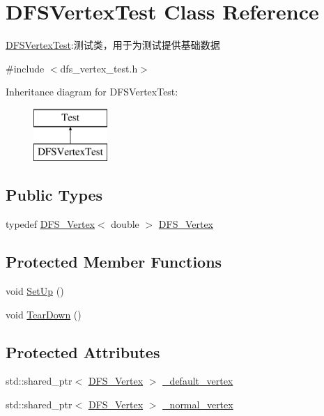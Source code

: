\hypertarget{class_d_f_s_vertex_test}{}\section{D\+F\+S\+Vertex\+Test Class Reference}
\label{class_d_f_s_vertex_test}


\hyperlink{class_d_f_s_vertex_test}{D\+F\+S\+Vertex\+Test}\+:测试类，用于为测试提供基础数据  




{\ttfamily \#include $<$dfs\+\_\+vertex\+\_\+test.\+h$>$}

Inheritance diagram for D\+F\+S\+Vertex\+Test\+:\begin{figure}[H]
\begin{center}
\leavevmode
\includegraphics[height=2.000000cm]{class_d_f_s_vertex_test}
\end{center}
\end{figure}
\subsection*{Public Types}
\begin{DoxyCompactItemize}
\item 
typedef \hyperlink{class_d_f_s_vertex_test_aee693bcc01455e6f663b1404ce66e914}{D\+F\+S\+\_\+\+Vertex}$<$ double $>$ \hyperlink{class_d_f_s_vertex_test_aee693bcc01455e6f663b1404ce66e914}{D\+F\+S\+\_\+\+Vertex}
\end{DoxyCompactItemize}
\subsection*{Protected Member Functions}
\begin{DoxyCompactItemize}
\item 
void \hyperlink{class_d_f_s_vertex_test_a2a285e5c1ce500544b5591107e251357}{Set\+Up} ()
\item 
void \hyperlink{class_d_f_s_vertex_test_a3592b0e27fb73147848d2251eb063730}{Tear\+Down} ()
\end{DoxyCompactItemize}
\subsection*{Protected Attributes}
\begin{DoxyCompactItemize}
\item 
std\+::shared\+\_\+ptr$<$ \hyperlink{class_d_f_s_vertex_test_aee693bcc01455e6f663b1404ce66e914}{D\+F\+S\+\_\+\+Vertex} $>$ \hyperlink{class_d_f_s_vertex_test_aeb4886b7d27389066e8ade9c7d5a1b87}{\+\_\+default\+\_\+vertex}
\item 
std\+::shared\+\_\+ptr$<$ \hyperlink{class_d_f_s_vertex_test_aee693bcc01455e6f663b1404ce66e914}{D\+F\+S\+\_\+\+Vertex} $>$ \hyperlink{class_d_f_s_vertex_test_a7c88bbdb6487f913f67ed34f915381e4}{\+\_\+normal\+\_\+vertex}
\end{DoxyCompactItemize}


